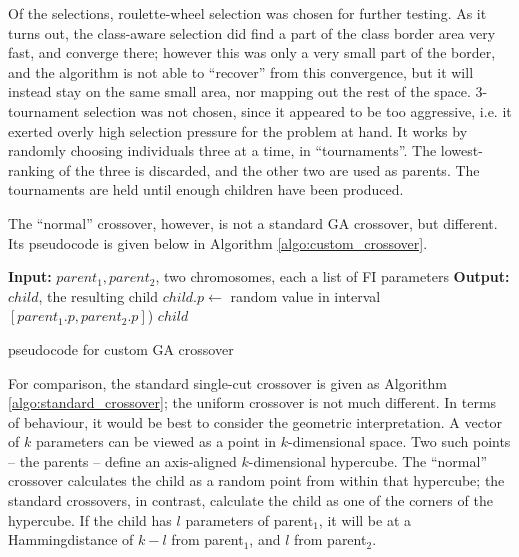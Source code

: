 \documentclass[times, utf8, diplomski]{fer}
\begin{document}
Of the selections, roulette-wheel selection was chosen for further testing.
As it turns out, the class-aware selection did find a part of the class border
area very fast, and converge there; however this was only a very small part of
the border, and the algorithm is not able to ``recover'' from this convergence,
but it will instead stay on the same small area, nor mapping out the rest of
the space.
3-tournament selection was not chosen, since it appeared to be too aggressive,
i.e. it exerted overly high selection pressure for the problem at hand.
It works by randomly choosing individuals three at a time, in ``tournaments''.
The lowest-ranking of the three is discarded, and the other two are used as
parents. The tournaments are held until enough children have been produced.


The ``normal'' crossover, however, is not a standard GA crossover, but different.
Its pseudocode is given below in Algorithm \ref{algo:custom_crossover}.

\begin{algorithm}
    \small
    \begin{algorithmic}
        \STATE \textbf{Input:} $parent_1, parent_2$, two chromosomes, each a list of FI parameters
        \STATE \textbf{Output:} $child$, the resulting child
            \STATE $child.p \gets $ random value in interval $[parent_1.p, parent_2.p]$)
        \ENDFOR
        \RETURN $child$
    \end{algorithmic}
    \caption{pseudocode for custom GA crossover}
    \label{algo:custom_crossover}
\end{algorithm}

For comparison, the standard single-cut crossover is given as Algorithm
\ref{algo:standard_crossover}; the uniform crossover is not much different.
In terms of behaviour, it would be best to consider the geometric interpretation.
A vector of $k$ parameters can be viewed as a point in $k$-dimensional space.
Two such points -- the parents -- define an axis-aligned $k$-dimensional hypercube.
The ``normal'' crossover calculates the child as a random point from within
that hypercube; the standard crossovers, in contrast, calculate the child as
one of the corners of the hypercube. If the child has $l$ parameters of parent$_1$,
it will be at a Hamming\footnotemark distance of $k-l$ from parent$_1$, and $l$
from parent$_2$.

\end{document}
